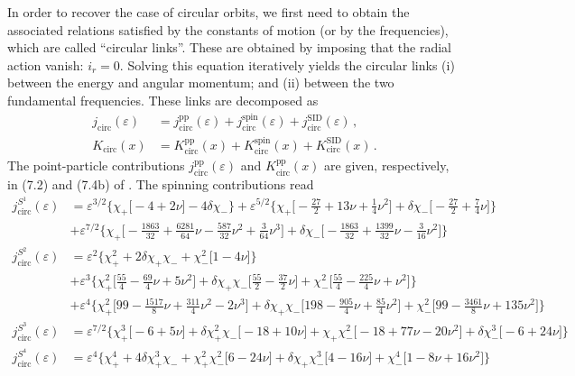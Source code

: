 \documentclass[prd,superscriptaddress,preprintnumbers,tightenlines,nofootinbib, eqsecnum]{revtex4-2}
\newcommand{\nn}{\nonumber}
\begin{document}
In order to recover the case of circular orbits, we first need to obtain the associated relations satisfied by the constants of motion (or by the frequencies), which are called ``circular links''. These are obtained by imposing that the radial action vanish: $i_r =0$. Solving this equation iteratively yields the circular links  (i) between the energy and angular momentum; and (ii) between the two fundamental frequencies. These links are decomposed as
\begin{subequations}
\begin{align}
    j_\text{circ}(\varepsilon) &= j_\text{circ}^\text{pp}(\varepsilon)+j_\text{circ}^\text{spin}(\varepsilon)+j_\text{circ}^\text{SID}(\varepsilon)\,,\\
    K_\text{circ}(x) &= K_\text{circ}^\text{pp}(x)+K_\text{circ}^\text{spin}(x)+K_\text{circ}^\text{SID}(x) \,.
\end{align}
\end{subequations}
The point-particle contributions $j_\text{circ}^\text{pp}(\varepsilon)$ and $K_\text{circ}^\text{pp}(x)$ are given, respectively, in (7.2) and (7.4b) of \cite{Trestini:2025yyc}. The spinning contributions read
\begin{subequations}
\begin{align}
j_{\text{circ}}^{S^1}(\varepsilon) &= \varepsilon^{3/2}\Bigg\{\chi_{+}\Bigg[-4 + 2 \nu\Bigg] - 4 \delta\chi_{-}\Bigg\}  + \varepsilon^{5/2}\Bigg\{\chi_{+}\Bigg[-\frac{27}{2} + 13 \nu + \frac{1}{4} \nu^{2}\Bigg] + \delta\chi_{-}\Bigg[-\frac{27}{2} + \frac{7}{4} \nu\Bigg]\Bigg\} \nn \\
& + \varepsilon^{7/2}\Bigg\{\chi_{+}\Bigg[-\frac{1863}{32} + \frac{6281}{64} \nu - \frac{587}{32} \nu^{2} + \frac{3}{64} \nu^{3}\Bigg] + \delta\chi_{-}\Bigg[-\frac{1863}{32} + \frac{1399}{32} \nu - \frac{3}{16} \nu^{2}\Bigg]\Bigg\} \\
j_{\text{circ}}^{S^2}(\varepsilon) &= \varepsilon^{2}\Bigg\{\chi_{+}^2 + 2 \delta\chi_{+}\chi_{-} + \chi_{-}^2\Bigg[1 - 4 \nu\Bigg]\Bigg\} \nn \\
& + \varepsilon^{3}\Bigg\{\chi_{+}^2\Bigg[\frac{55}{4} - \frac{69}{4} \nu + 5 \nu^{2}\Bigg] + \delta\chi_{+}\chi_{-}\Bigg[\frac{55}{2} - \frac{37}{2} \nu\Bigg] + \chi_{-}^2\Bigg[\frac{55}{4} - \frac{225}{4} \nu + \nu^{2}\Bigg]\Bigg\} \nn \\
& + \varepsilon^{4}\Bigg\{\chi_{+}^2\Bigg[99 - \frac{1517}{8} \nu + \frac{311}{4} \nu^{2} - 2 \nu^{3}\Bigg] + \delta\chi_{+}\chi_{-}\Bigg[198 - \frac{905}{4} \nu + \frac{85}{4} \nu^{2}\Bigg] + \chi_{-}^2\Bigg[99 - \frac{3461}{8} \nu + 135 \nu^{2}\Bigg]\Bigg\} \\
j_{\text{circ}}^{S^3}(\varepsilon) &= \varepsilon^{7/2}\Bigg\{\chi_{+}^3\Bigg[-6 + 5 \nu\Bigg] + \delta\chi_{+}^2\chi_{-}\Bigg[-18 + 10 \nu\Bigg] + \chi_{+}\chi_{-}^2\Bigg[-18 + 77 \nu - 20 \nu^{2}\Bigg] + \delta\chi_{-}^3\Bigg[-6 + 24 \nu\Bigg]\Bigg\} \\
j_{\text{circ}}^{S^4}(\varepsilon) &= \varepsilon^{4}\Bigg\{\chi_{+}^4 + 4 \delta\chi_{+}^3\chi_{-} + \chi_{+}^2\chi_{-}^2\Bigg[6 - 24 \nu\Bigg] + \delta\chi_{+}\chi_{-}^3\Bigg[4 - 16 \nu\Bigg] + \chi_{-}^4\Bigg[1 - 8 \nu + 16 \nu^{2}\Bigg]\Bigg\}
\end{align}
\end{subequations}
\end{document}
